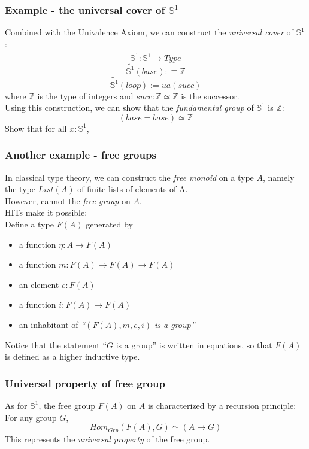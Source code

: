 \documentclass[dvipdfmx]{beamer}
\begin{document}
\begin{frame}
  \frametitle{Example - the universal cover of ${\mathbb S}^1$}
  Combined with the Univalence Axiom,
  we can construct the {\it universal cover} of ${\mathbb S}^1$:
  \[
    \widetilde{ {\mathbb S}^1 } : {\mathbb S}^1 \to Type
  \]
  \[
    \widetilde{ {\mathbb S}^1 } \left( base \right) :\equiv {\mathbb Z}
  \]
  \[
    \widetilde{ {\mathbb S}^1 } \left( loop \right) := ua \left( succ \right)
  \]
  where ${\mathbb Z}$ is the type of integers
  and $succ : {\mathbb Z} \simeq {\mathbb Z}$ is the successor.
  \pause
  \\
  Using this construction, we can show that
  the {\it fundamental group} of ${\mathbb S}^1$ is ${\mathbb Z}$:
  \[
    \left( base = base \right) \simeq {\mathbb Z}
  \]
  Show that for all $x : {\mathbb S}^1$,
\end{frame}

\begin{frame}
  \frametitle{Another example - free groups}
  In classical type theory,
  we can construct the {\it free monoid} on a type $A$,
  namely the type $List \left( A \right)$ of finite lists
  of elements of A.
  \pause
  \\
  However, cannot the {\it free group} on $A$.
  \pause
  \\
  HITs make it possible:
  \\
  Define a type $F \left( A \right)$ generated by
  \begin{itemize}
      \pause
    \item a function $\eta : A \to F \left( A \right)$
    \item a function $m : F \left( A \right) \to
      F \left( A \right) \to F \left( A \right)$
    \item an element $e : F \left( A \right)$
    \item a function $i : F \left( A \right) \to F \left( A \right)$
      \pause
    \item an inhabitant of
      {\it ``$\left( F \left( A \right) , m , e , i \right)$ is a group''}
  \end{itemize}
  \pause
  Notice that the statement ``$G$ is a group''
  is written in equations, so that
  $F \left( A \right)$ is defined as a higher inductive type.
\end{frame}

\begin{frame}
  \frametitle{Universal property of free group}
  As for ${\mathbb S}^1$,
  the free group $F \left( A \right)$ on $A$
  is characterized by a recursion principle:
  \\
  For any group $G$,
  \[
    Hom_{Grp} \left( F \left( A \right) , G \right)
    \simeq
    \left( A \to G \right)
  \]
  This represents the {\it universal property}
  of the free group.
\end{frame}
\end{document}
